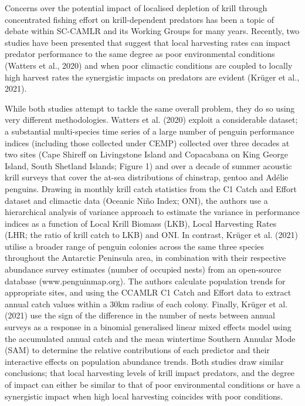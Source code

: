 \documentclass[]{elsarticle} %
\begin{document}
Concerns over the potential impact of localised depletion of krill
through concentrated fishing effort on krill-dependent predators has
been a topic of debate within SC-CAMLR and its Working Groups for many
years. Recently, two studies have been presented that suggest that local
harvesting rates can impact predator performance to the same degree as
poor environmental conditions (Watters et al., 2020) and when poor
climactic conditions are coupled to locally high harvest rates the
synergistic impacts on predators are evident (Krüger et al., 2021).

While both studies attempt to tackle the same overall problem, they do
so using very different methodologies. Watters et al. (2020) exploit a
considerable dataset; a substantial multi-species time series of a large
number of penguin performance indices (including those collected under
CEMP) collected over three decades at two sites (Cape Shireff on
Livingstone Island and Copacabana on King George Island, South Shetland
Islands; Figure 1) and over a decade of summer acoustic krill surveys
that cover the at-sea distributions of chinstrap, gentoo and Adélie
penguins. Drawing in monthly krill catch statistics from the C1 Catch
and Effort dataset and climactic data (Oceanic Niño Index; ONI), the
authors use a hierarchical analysis of variance approach to estimate the
variance in performance indices as a function of Local Krill Biomass
(LKB), Local Harvesting Rates (LHR; the ratio of krill catch to LKB) and
ONI. In contrast, Krüger et al. (2021) utilise a broader range of
penguin colonies across the same three species throughout the Antarctic
Peninsula area, in combination with their respective abundance survey
estimates (number of occupied nests) from an open-source database
(www.penguinmap.org). The authors calculate population trends for
appropriate sites, and using the CCAMLR C1 Catch and Effort data to
extract annual catch values within a 30km radius of each colony.
Finally, Krüger et al. (2021) use the sign of the difference in the
number of nests between annual surveys as a response in a binomial
generalised linear mixed effects model using the accumulated annual
catch and the mean wintertime Southern Annular Mode (SAM) to determine
the relative contributions of each predictor and their interactive
effects on population abundance trends. Both studies draw similar
conclusions; that local harvesting levels of krill impact predators, and
the degree of impact can either be similar to that of poor environmental
conditions or have a synergistic impact when high local harvesting
coincides with poor conditions.
\end{document}
